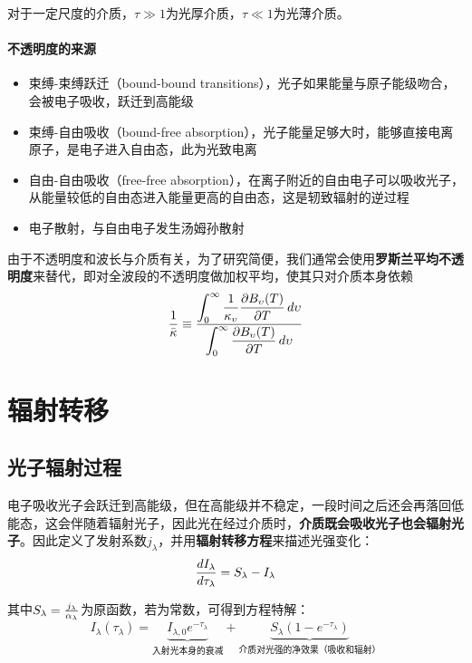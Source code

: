 \documentclass[openany]{ctexbook}
\begin{document}
对于一定尺度的介质，$\tau\gg1$为光厚介质，$\tau\ll1$为光薄介质。

\paragraph{不透明度的来源}
\begin{itemize}
  \item 束缚-束缚跃迁（bound-bound transitions），光子如果能量与原子能级吻合，会被电子吸收，跃迁到高能级
  \item 束缚-自由吸收（bound-free absorption），光子能量足够大时，能够直接电离原子，是电子进入自由态，此为光致电离
  \item 自由-自由吸收（free-free absorption），在离子附近的自由电子可以吸收光子，从能量较低的自由态进入能量更高的自由态，这是轫致辐射的逆过程
  \item 电子散射，与自由电子发生汤姆孙散射
\end{itemize}

由于不透明度和波长与介质有关，为了研究简便，我们通常会使用\textbf{罗斯兰平均不透明度}来替代，即对全波段的不透明度做加权平均，使其只对介质本身依赖
\begin{equation}
  {1\over \bar\kappa} \equiv{\displaystyle\int_0^\infty {1\over \kappa_\upsilon}{\partial B_\upsilon(T)\over \partial T}\,d\upsilon \over \displaystyle\int_0^\infty{\partial B_\upsilon(T)\over \partial T}\,d\upsilon}
\end{equation}

\section{辐射转移}
\subsection{光子辐射过程}
电子吸收光子会跃迁到高能级，但在高能级并不稳定，一段时间之后还会再落回低能态，这会伴随着辐射光子，因此光在经过介质时，\textbf{介质既会吸收光子也会辐射光子}。因此定义了发射系数$j_\lambda$，并用\textbf{辐射转移方程}来描述光强变化：
\begin{equation}
  {dI_\lambda \over d\tau_\lambda}=S_\lambda-I_\lambda
\end{equation}

其中$S_\lambda={j_\lambda\over \alpha_\lambda}$为原函数，若为常数，可得到方程特解：
\begin{equation}
  I_\lambda(\tau_\lambda)=\underbrace{I_{\lambda,0}e^{-\tau_\lambda}}_\text{入射光本身的衰减}+\underbrace{S_\lambda(1-e^{-\tau_\lambda})}_\text{介质对光强的净效果（吸收和辐射）}
\end{equation}
\end{document}
